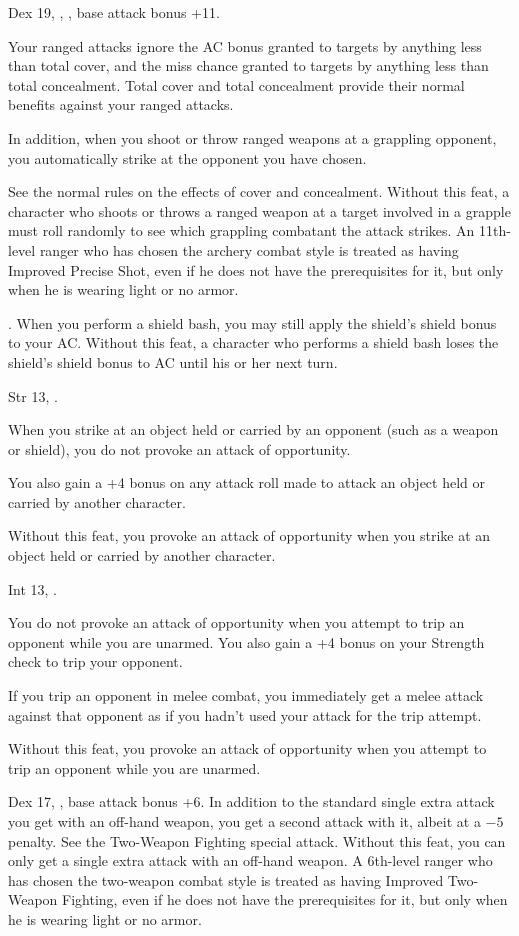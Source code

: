 {}
{Dex 19, , , base attack bonus +11.}
{Your ranged attacks ignore the AC bonus granted to targets by anything less than total cover, and the miss chance granted to targets by anything less than total concealment. Total cover and total concealment provide their normal benefits against your ranged attacks.

In addition, when you shoot or throw ranged weapons at a grappling opponent, you automatically strike at the opponent you have chosen.}
{See the normal rules on the effects of cover and concealment. Without this feat, a character who shoots or throws a ranged weapon at a target involved in a grapple must roll randomly to see which grappling combatant the attack strikes.}
{An 11th-level ranger who has chosen the archery combat style is treated as having Improved Precise Shot, even if he does not have the prerequisites for it, but only when he is wearing light or no armor.}

{}
{.}
{When you perform a shield bash, you may still apply the shield's shield bonus to your AC.}
{Without this feat, a character who performs a shield bash loses the shield's shield bonus to AC until his or her next turn.}{}

{}
{Str 13, .}
{When you strike at an object held or carried by an opponent (such as a weapon or shield), you do not provoke an attack of opportunity.

You also gain a +4 bonus on any attack roll made to attack an object held or carried by another character.}
{Without this feat, you provoke an attack of opportunity when you strike at an object held or carried by another character.}{}

{}
{Int 13, .}
{You do not provoke an attack of opportunity when you attempt to trip an opponent while you are unarmed. You also gain a +4 bonus on your Strength check to trip your opponent.

If you trip an opponent in melee combat, you immediately get a melee attack against that opponent as if you hadn't used your attack for the trip attempt.}
{Without this feat, you provoke an attack of opportunity when you attempt to trip an opponent while you are unarmed.}{}

{}
{Dex 17, , base attack bonus +6.}
{In addition to the standard single extra attack you get with an off-hand weapon, you get a second attack with it, albeit at a $-5$ penalty. See the Two-Weapon Fighting special attack.}
{Without this feat, you can only get a single extra attack with an off-hand weapon.}
{A 6th-level ranger who has chosen the two-weapon combat style is treated as having Improved Two-Weapon Fighting, even if he does not have the prerequisites for it, but only when he is wearing light or no armor.}

